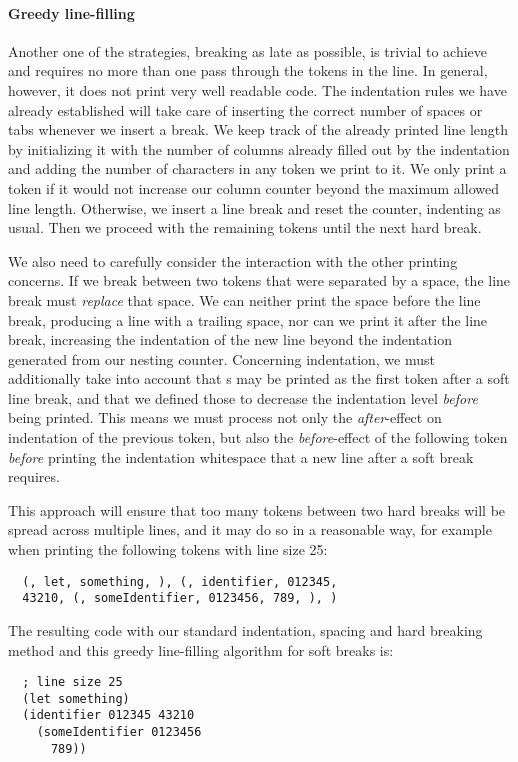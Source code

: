 \paragraph{Greedy line-filling}
Another one of the strategies, breaking as late as possible,
is trivial to achieve and requires no more than one pass through the tokens in the line.
In general, however, it does not print very well readable code.
The indentation rules we have already established will take care of inserting
the correct number of spaces or tabs whenever we insert a break.
We keep track of the already printed line length by initializing it with the
number of columns already filled out by the indentation and adding the number
of characters in any token we print to it.
We only print a token if it would not increase our column counter beyond
the maximum allowed line length.
Otherwise, we insert a line break and reset the counter, indenting as usual.
Then we proceed with the remaining tokens until the next hard break.

We also need to carefully consider the interaction with the other printing concerns.
If we break between two tokens that were separated by a space,
the line break must \textit{replace} that space.
We can neither print the space before the line break, producing a line with a trailing space,
nor can we print it after the line break, increasing the indentation of the new line
beyond the indentation generated from our nesting counter.
Concerning indentation, we must additionally take into account that s
may be printed as the first token after a soft line break,
and that we defined those to decrease the indentation level \textit{before} being printed.
This means we must process not only the \textit{after}-effect on indentation of the previous token,
but also the \textit{before}-effect of the following token \textit{before}
printing the indentation whitespace that a new line after a soft break requires.

This approach will ensure that too many tokens between two hard breaks will be spread
across multiple lines, and it may do so in a reasonable way,
for example when printing the following tokens with line size 25:
\begin{verbatim}
  (, let, something, ), (, identifier, 012345,
  43210, (, someIdentifier, 0123456, 789, ), )
\end{verbatim}
The resulting code with our standard indentation, spacing and hard breaking method
and this greedy line-filling algorithm for soft breaks is:
\begin{verbatim}
  ; line size 25
  (let something)
  (identifier 012345 43210
    (someIdentifier 0123456
      789))
\end{verbatim}


